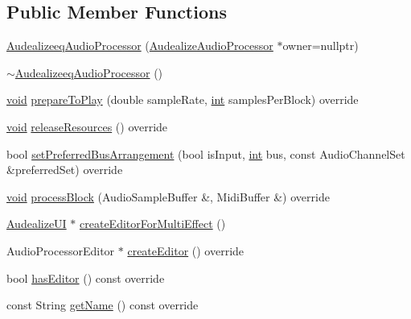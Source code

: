 \subsection*{Public Member Functions}
\begin{DoxyCompactItemize}
\item 
\hyperlink{class_audealize_1_1_audealizeeq_audio_processor_ad3f864e2039bf76b23315ee5454ef198}{Audealizeeq\+Audio\+Processor} (\hyperlink{class_audealize_1_1_audealize_audio_processor}{Audealize\+Audio\+Processor} $\ast$owner=nullptr)
\item 
\hyperlink{class_audealize_1_1_audealizeeq_audio_processor_a9a77f54b0503b3949b51ccf0a94a63ed}{$\sim$\+Audealizeeq\+Audio\+Processor} ()
\item 
\hyperlink{tk_8h_aba408b7cd755a96426e004c015f5de8e}{void} \hyperlink{class_audealize_1_1_audealizeeq_audio_processor_a4bba4adcf5b948a1e1e1d78d21432efd}{prepare\+To\+Play} (double sample\+Rate, \hyperlink{tk_8h_a83f82f76e7fed06f4c49d2db94028a6d}{int} samples\+Per\+Block) override
\item 
\hyperlink{tk_8h_aba408b7cd755a96426e004c015f5de8e}{void} \hyperlink{class_audealize_1_1_audealizeeq_audio_processor_ac002e503f882352da067e88bbdd3e994}{release\+Resources} () override
\item 
bool \hyperlink{class_audealize_1_1_audealizeeq_audio_processor_abcd1446899a51c06397970535af8cb64}{set\+Preferred\+Bus\+Arrangement} (bool is\+Input, \hyperlink{tk_8h_a83f82f76e7fed06f4c49d2db94028a6d}{int} bus, const Audio\+Channel\+Set \&preferred\+Set) override
\item 
\hyperlink{tk_8h_aba408b7cd755a96426e004c015f5de8e}{void} \hyperlink{class_audealize_1_1_audealizeeq_audio_processor_a215bf8fc1c14a5a8f586ad9463b33d0a}{process\+Block} (Audio\+Sample\+Buffer \&, Midi\+Buffer \&) override
\item 
\hyperlink{class_audealize_1_1_audealize_u_i}{Audealize\+UI} $\ast$ \hyperlink{class_audealize_1_1_audealizeeq_audio_processor_a18452a450268fa3e3cadd491525fe01c}{create\+Editor\+For\+Multi\+Effect} ()
\item 
Audio\+Processor\+Editor $\ast$ \hyperlink{class_audealize_1_1_audealizeeq_audio_processor_abb95853d018607894a95abf40ca6e308}{create\+Editor} () override
\item 
bool \hyperlink{class_audealize_1_1_audealizeeq_audio_processor_a97650263b1f2399d88f51bef0d2ad0a3}{has\+Editor} () const  override
\item 
const String \hyperlink{class_audealize_1_1_audealizeeq_audio_processor_a7f7b09545ea360ad27d2493467965891}{get\+Name} () const  override

\end{DoxyCompactItemize}
